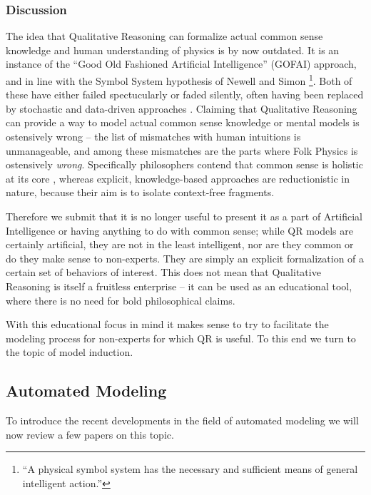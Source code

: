 \documentclass{article} %
\begin{document}
\subsubsection{Discussion}
\label{sec:lit_discussion}
The idea that Qualitative Reasoning can formalize actual common sense knowledge
and human understanding of physics is by now outdated. It is an instance of the
``Good Old Fashioned Artificial Intelligence'' (GOFAI) approach,
\cite{haugeland} and in line with the Symbol System hypothesis of Newell and
Simon \cite{newell}\footnote{``A physical symbol system has the necessary and
sufficient means of general intelligent action.''}.  Both of these have either
failed spectucularly or faded silently, often having been replaced by
stochastic and data-driven approaches \cite{russellnorvig}.  Claiming that
Qualitative Reasoning can provide a way to model actual common sense knowledge
or mental models is ostensively wrong -- the list of mismatches with human
intuitions is unmanageable, and among these mismatches are the parts where Folk
Physics is ostensively {\em wrong}. Specifically philosophers contend that
common sense is holistic at its core \cite{smith}, whereas explicit,
knowledge-based approaches are reductionistic in nature, because their aim is
to isolate context-free fragments. 

Therefore we submit that it is no longer useful to present it as a part of
Artificial Intelligence or having anything to do with common sense; while QR
models are certainly artificial, they are not in the least intelligent, nor are
they common or do they make sense to non-experts.  They are simply an explicit
formalization of a certain set of behaviors of interest. This does not mean
that Qualitative Reasoning is itself a fruitless enterprise -- it can be used
as an educational tool, where there is no need for bold philosophical claims.

With this educational focus in mind it makes sense to try to facilitate the
modeling process for non-experts for which QR is useful. To this end we turn
to the topic of model induction.

\subsection{Automated Modeling} %

To introduce the recent developments in the field of automated modeling we
will now review a few papers on this topic.
\end{document}
